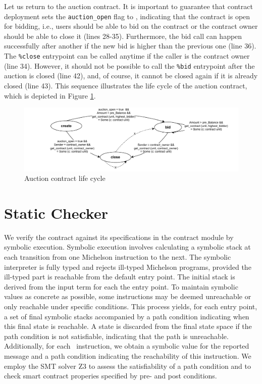 \documentclass[a4paper,USenglish,cleveref, autoref,anonymous]{lipics-v2021}
\begin{document}
Let us return to the auction contract. It is important to guarantee
that contract deployment sets the  \lstinline/auction_open/ flag to
\TRUE, indicating that the contract is open for bidding, i.e., users
should be able to bid on the contract or the contract owner should be
able to close it (lines 28-35). Furthermore, the bid call can happen
successfully after another if the new bid is higher than the previous
one (line 36). The  \lstinline/%close/ entrypoint can be called
anytime if the caller is the contract owner (line 34). However, it
should not be possible to call the  \lstinline/%bid/ entrypoint after
the auction is closed (line 42), and, of course, it cannot be closed
again if it is already closed (line 43). This sequence  illustrates
the life cycle of the auction contract, which is depicted in Figure
\ref{fig:auction-life-cycle}.

\begin{figure}[tp]
    \centering
    \includegraphics[width=1.1\textwidth]{auction-life-cycle}
    \caption{Auction contract life cycle}
    \label{fig:auction-life-cycle}
\end{figure}


\section{Static Checker}
\label{sec:static-checker-we}
We verify the contract against its specifications in the contract
module by symbolic execution. Symbolic execution involves calculating
a symbolic stack at each transition from one Michelson instruction to
the next. The symbolic interpreter is fully typed and rejects
ill-typed Michelson programs, provided the ill-typed part is reachable
from the default entry point.  The initial stack is derived from the
input term for each the entry point. To maintain symbolic values as
concrete as possible, some instructions may be deemed unreachable or
only reachable under specific conditions. This process yields, for
each entry point, a set of final symbolic stacks accompanied by a path
condition indicating when this final state is reachable. A state is
discarded from the final state space if the path condition is not
satisfiable, indicating that the path is unreachable. Additionally,
for each \FAILWITH\ instruction, we obtain a symbolic value for the
reported message and a path condition indicating the reachability of
this instruction. We employ the SMT solver Z3  to assess the
satisfiability of a path condition and to check smart contract
properies specified by pre- and post conditions.
\end{document}

